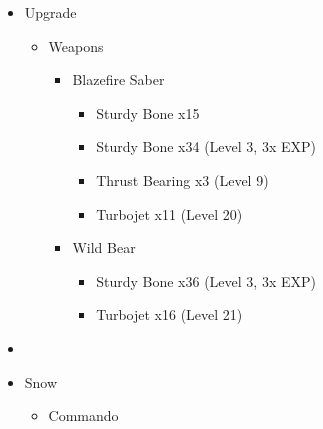 \begin{multicols}{2}
\begin{upgrade}
    \begin{itemize}
      \item Upgrade
            \begin{itemize}
              \item Weapons
                    \begin{itemize}
                      \item Blazefire Saber
                            \begin{itemize}
                              \item Sturdy Bone x15
                              \item Sturdy Bone x34 (Level 3, 3x EXP)
                              \item Thrust Bearing x3 (Level 9)
                              \item Turbojet x11 (Level 20)
                            \end{itemize}
                      \item Wild Bear
                            \begin{itemize}
                              \item Sturdy Bone x36 (Level 3, 3x EXP)
                              \item Turbojet x16 (Level 21)
                            \end{itemize}
                    \end{itemize}
            \end{itemize}
    \end{itemize}
  \end{upgrade}
  \vfill
  \begin{menu}
    \begin{itemize}
      \paradigm
      \begin{itemize}
        \item {}%
              {\paradigmline[1]{\textit{\com}}{\textit{\rav}}{}}%
              {\paradigmline{\com}{\med}{}}%
              {\paradigmline{\sen}{\med}{}}%
              {\paradigmline{\sen}{\syn}{}}%
              {\paradigmline{[\rav]}{\rav}{}}%
              {\paradigmline{[\rav]}{\rav}{}}
      \end{itemize}
      \crystarium
      \begin{itemize}
        \item Snow
              \begin{itemize}
                \item Commando

\end{itemize}
\end{itemize}
\end{itemize}
\end{menu}
\end{multicols}
